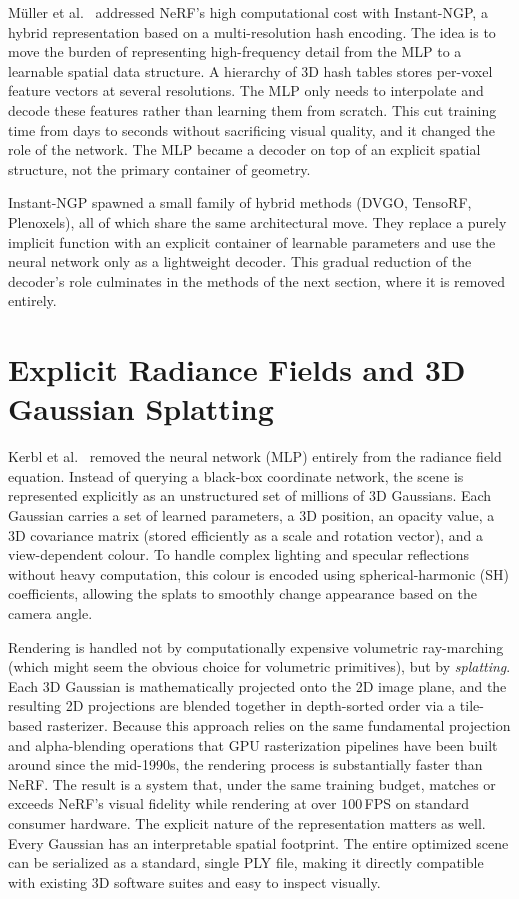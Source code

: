 Müller et al.~\cite{mller2022} addressed NeRF's high computational cost with
Instant-NGP, a hybrid representation based on a multi-resolution hash encoding.
The idea is to move the burden of representing high-frequency detail from the
MLP to a learnable spatial data structure. A hierarchy of 3D hash tables stores
per-voxel feature vectors at several resolutions. The MLP only needs to
interpolate and decode these features rather than learning them from scratch.
This cut training time from days to seconds without sacrificing visual quality,
and it changed the role of the network. The MLP became a decoder on top of an
explicit spatial structure, not the primary container of geometry.

Instant-NGP spawned a small family of hybrid methods (DVGO, TensoRF, Plenoxels),
all of which share the same architectural move. They replace a purely implicit
function with an explicit container of learnable parameters and use the neural
network only as a lightweight decoder. This gradual reduction of the decoder's
role culminates in the methods of the next section, where it is removed
entirely.

\section{Explicit Radiance Fields and 3D Gaussian Splatting}

Kerbl et al.~\cite{kerbl2023} removed the neural network (MLP) entirely from the
radiance field equation. Instead of querying a
black-box coordinate network, the scene is represented explicitly as an
unstructured set of millions of 3D Gaussians. Each Gaussian carries a set of
learned parameters, a 3D position, an opacity value, a 3D covariance matrix
(stored efficiently as a scale and rotation vector), and a view-dependent
colour. To handle complex lighting and specular reflections without heavy
computation, this colour is encoded using spherical-harmonic (SH) coefficients,
allowing the splats to smoothly change appearance based on the camera angle.

Rendering is handled not by computationally expensive volumetric ray-marching
(which might seem the obvious choice for volumetric primitives), but by
\emph{splatting}. Each 3D Gaussian is mathematically projected onto the 2D image
plane, and the resulting 2D projections are blended together in depth-sorted
order via a tile-based rasterizer. Because this approach relies on the same
fundamental projection and alpha-blending operations that GPU rasterization
pipelines have been built around since the mid-1990s, the rendering process is
substantially faster than NeRF. The result is a system that, under the same
training budget, matches or exceeds NeRF's visual fidelity while rendering at
over $100$\,FPS on standard consumer hardware. The explicit nature of the
representation matters as well. Every Gaussian has an interpretable spatial
footprint. The entire optimized scene can be serialized as
a standard, single PLY file, making it directly compatible with existing 3D
software suites and easy to inspect visually.

